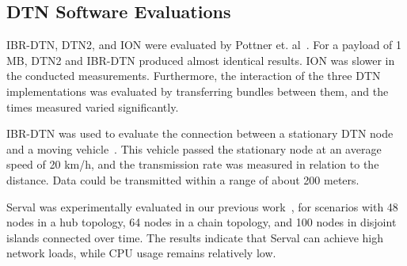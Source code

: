 \subsection{DTN Software Evaluations}

IBR-DTN, DTN2, and ION were evaluated by Pottner et. al~\cite{pottner2011performance}. For a payload of 1 MB, DTN2 and IBR-DTN produced almost identical results. ION was slower in the conducted measurements. Furthermore, the interaction of the three DTN implementations was evaluated by transferring bundles between them, and the times measured varied significantly.

IBR-DTN was used to evaluate the connection between a stationary DTN node and a moving vehicle~\cite{doering2008ibr}. This vehicle passed the stationary node at an average speed of 20 km/h, and the transmission rate was measured in relation to the distance. Data could be transmitted within a range of about 200 meters.

Serval was experimentally evaluated in our previous work~\cite{baumgaertner2016serval}, for scenarios with 48 nodes in a hub topology, 64 nodes in a chain topology, and 100 nodes in disjoint islands connected over time. The results indicate that Serval can achieve high network loads, while CPU usage remains relatively low.
